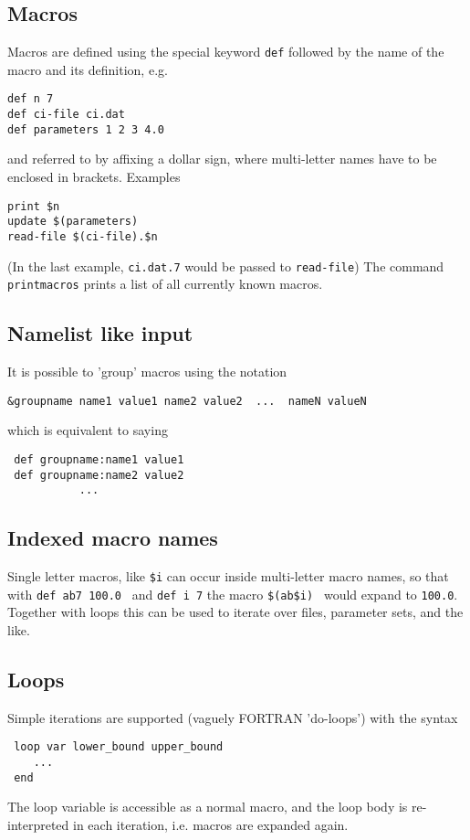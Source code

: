 \documentclass[a4paper]{article}
\begin{document}
\subsection{Macros}
Macros are defined using the special keyword {\tt def} followed by
the name of the macro and its definition, e.g.
\begin{verbatim}
def n 7
def ci-file ci.dat
def parameters 1 2 3 4.0  
\end{verbatim} 
and referred to by affixing a dollar sign, where multi-letter
names have to be enclosed in brackets. Examples
\begin{verbatim}
print $n
update $(parameters)
read-file $(ci-file).$n
\end{verbatim} 
(In the last example, {\tt  ci.dat.7} would be passed to {\tt read-file})
The command {\tt printmacros} prints a list of all currently known 
macros. 
\subsection{Namelist like input}
It is possible to 'group' macros using the notation
\begin{verbatim}
&groupname name1 value1 name2 value2  ...  nameN valueN
\end{verbatim}
which is equivalent to saying 
\begin{verbatim}
 def groupname:name1 value1
 def groupname:name2 value2
           ...
\end{verbatim}
\subsection{Indexed macro names}
Single letter macros, like {\tt {\$}i} can occur inside multi-letter
macro names, so that with {\tt def ab7 100.0 } and {\tt def i 7} 
the macro {\tt \$(ab\$i) } would expand to {\tt 100.0}. Together with
loops this can be used to iterate over files, parameter sets, and the like.

\subsection{Loops}
Simple iterations are supported (vaguely  FORTRAN 'do-loops') with the 
syntax
\begin{verbatim}
 loop var lower_bound upper_bound 
    ...
 end
\end{verbatim}
The loop variable is accessible as a normal macro, and the loop body is
re-interpreted in each iteration, i.e. macros are expanded again.  
\end{document}
